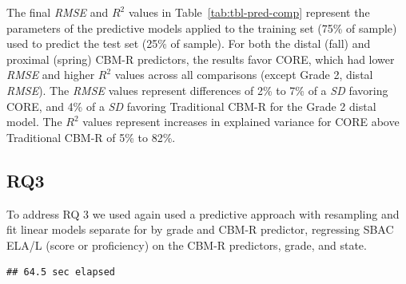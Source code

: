 \documentclass[
  english,
  man, fleqn, noextraspace]{apa6}
\begin{document}
The final \emph{RMSE} and \(R^2\) values in Table~\ref{tab:tbl-pred-comp} represent the parameters of the predictive models applied to the training set (75\% of sample) used to predict the test set (25\% of sample). For both the distal (fall) and proximal (spring) CBM-R predictors, the results favor CORE, which had lower \emph{RMSE} and higher \(R^2\) values across all comparisons (except Grade 2, distal \emph{RMSE}). The \emph{RMSE} values represent differences of 2\% to 7\% of a \emph{SD} favoring CORE, and 4\% of a \emph{SD} favoring Traditional CBM-R for the Grade 2 distal model. The \(R^2\) values represent increases in explained variance for CORE above Traditional CBM-R of 5\% to 82\%.

\hypertarget{rq3}{%
\subsection{RQ3}\label{rq3}}

To address RQ 3 we used again used a predictive approach with resampling and fit linear models separate for by grade and CBM-R predictor, regressing SBAC ELA/L (score or proficiency) on the CBM-R predictors, grade, and state.

\begin{verbatim}
## 64.5 sec elapsed
\end{verbatim}
\end{document}
